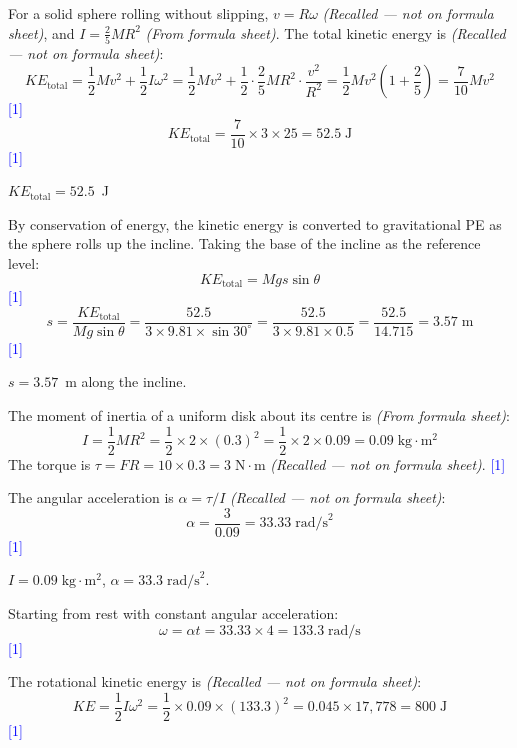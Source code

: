 \documentclass[12pt,a4paper]{article}
\newcommand{\markstep}[1]{\hfill\textcolor{blue}{[#1]}}
\newcommand{\finalanswer}[1]{%
  \begin{tcolorbox}[colback=green!5!white,colframe=green!50!black,boxrule=0.5pt]
  #1
  \end{tcolorbox}
}
\newcommand{\fromsheet}{\textit{(From formula sheet)}}
\newcommand{\recalled}{\textit{(Recalled --- not on formula sheet)}}
\begin{document}
\begin{parts}
\item
\begin{parts}
\item For a solid sphere rolling without slipping, $v = R\omega$ \recalled, and $I = \tfrac{2}{5}MR^2$ \fromsheet. The total kinetic energy is \recalled:
\[
KE_{\text{total}} = \frac{1}{2}Mv^2 + \frac{1}{2}I\omega^2 = \frac{1}{2}Mv^2 + \frac{1}{2}\cdot\frac{2}{5}MR^2\cdot\frac{v^2}{R^2} = \frac{1}{2}Mv^2\left(1 + \frac{2}{5}\right) = \frac{7}{10}Mv^2
\]
\markstep{1}
\[
KE_{\text{total}} = \frac{7}{10}\times 3\times 25 = 52.5\;\text{J}
\]
\markstep{1}

\finalanswer{$KE_{\text{total}} = 52.5$~J}

\item By conservation of energy, the kinetic energy is converted to gravitational PE as the sphere rolls up the incline. Taking the base of the incline as the reference level:
\[
KE_{\text{total}} = Mgs\sin\theta
\]
\markstep{1}
\[
s = \frac{KE_{\text{total}}}{Mg\sin\theta} = \frac{52.5}{3\times 9.81\times\sin 30^\circ} = \frac{52.5}{3\times 9.81\times 0.5} = \frac{52.5}{14.715} = 3.57\;\text{m}
\]
\markstep{1}

\finalanswer{$s = 3.57$~m along the incline.}
\end{parts}

\item
\begin{parts}
\item The moment of inertia of a uniform disk about its centre is \fromsheet:
\[
I = \frac{1}{2}MR^2 = \frac{1}{2}\times 2\times(0.3)^2 = \frac{1}{2}\times 2\times 0.09 = 0.09\;\text{kg}\cdot\text{m}^2
\]
The torque is $\tau = FR = 10\times 0.3 = 3\;\text{N}\cdot\text{m}$ \recalled. \markstep{1}

The angular acceleration is $\alpha = \tau/I$ \recalled:
\[
\alpha = \frac{3}{0.09} = 33.33\;\text{rad/s}^2
\]
\markstep{1}

\finalanswer{$I = 0.09\;\text{kg}\cdot\text{m}^2$, \quad $\alpha = 33.3\;\text{rad/s}^2$.}

\item Starting from rest with constant angular acceleration:
\[
\omega = \alpha t = 33.33\times 4 = 133.3\;\text{rad/s}
\]
\markstep{1}

The rotational kinetic energy is \recalled:
\[
KE = \frac{1}{2}I\omega^2 = \frac{1}{2}\times 0.09\times(133.3)^2 = 0.045\times 17{,}778 = 800\;\text{J}
\]
\markstep{1}


\end{parts}
\end{parts}
\end{document}
